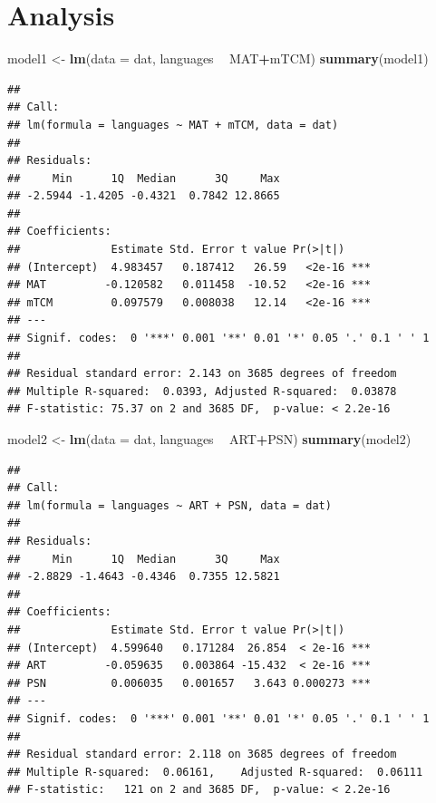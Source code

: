 \documentclass[12pt,]{article}
\newenvironment{Shaded}{\begin{snugshade}}{\end{snugshade}}
\newcommand{\KeywordTok}[1]{\textcolor[rgb]{0.13,0.29,0.53}{\textbf{#1}}}
\newcommand{\DataTypeTok}[1]{\textcolor[rgb]{0.13,0.29,0.53}{#1}}
\newcommand{\StringTok}[1]{\textcolor[rgb]{0.31,0.60,0.02}{#1}}
\newcommand{\OperatorTok}[1]{\textcolor[rgb]{0.81,0.36,0.00}{\textbf{#1}}}
\newcommand{\NormalTok}[1]{#1}
\begin{document}
\newpage

\section{Analysis}\label{analysis}

\begin{Shaded}
\begin{Highlighting}[]
\NormalTok{model1 <-}\StringTok{ }\KeywordTok{lm}\NormalTok{(}\DataTypeTok{data =}\NormalTok{ dat, languages }\OperatorTok{~}\StringTok{ }\NormalTok{MAT}\OperatorTok{+}\NormalTok{mTCM)}
\KeywordTok{summary}\NormalTok{(model1)}
\end{Highlighting}
\end{Shaded}

\begin{verbatim}
## 
## Call:
## lm(formula = languages ~ MAT + mTCM, data = dat)
## 
## Residuals:
##     Min      1Q  Median      3Q     Max 
## -2.5944 -1.4205 -0.4321  0.7842 12.8665 
## 
## Coefficients:
##              Estimate Std. Error t value Pr(>|t|)    
## (Intercept)  4.983457   0.187412   26.59   <2e-16 ***
## MAT         -0.120582   0.011458  -10.52   <2e-16 ***
## mTCM         0.097579   0.008038   12.14   <2e-16 ***
## ---
## Signif. codes:  0 '***' 0.001 '**' 0.01 '*' 0.05 '.' 0.1 ' ' 1
## 
## Residual standard error: 2.143 on 3685 degrees of freedom
## Multiple R-squared:  0.0393, Adjusted R-squared:  0.03878 
## F-statistic: 75.37 on 2 and 3685 DF,  p-value: < 2.2e-16
\end{verbatim}

\begin{Shaded}
\begin{Highlighting}[]
\NormalTok{model2 <-}\StringTok{ }\KeywordTok{lm}\NormalTok{(}\DataTypeTok{data =}\NormalTok{ dat, languages }\OperatorTok{~}\StringTok{ }\NormalTok{ART}\OperatorTok{+}\NormalTok{PSN)}
\KeywordTok{summary}\NormalTok{(model2)}
\end{Highlighting}
\end{Shaded}

\begin{verbatim}
## 
## Call:
## lm(formula = languages ~ ART + PSN, data = dat)
## 
## Residuals:
##     Min      1Q  Median      3Q     Max 
## -2.8829 -1.4643 -0.4346  0.7355 12.5821 
## 
## Coefficients:
##              Estimate Std. Error t value Pr(>|t|)    
## (Intercept)  4.599640   0.171284  26.854  < 2e-16 ***
## ART         -0.059635   0.003864 -15.432  < 2e-16 ***
## PSN          0.006035   0.001657   3.643 0.000273 ***
## ---
## Signif. codes:  0 '***' 0.001 '**' 0.01 '*' 0.05 '.' 0.1 ' ' 1
## 
## Residual standard error: 2.118 on 3685 degrees of freedom
## Multiple R-squared:  0.06161,    Adjusted R-squared:  0.06111 
## F-statistic:   121 on 2 and 3685 DF,  p-value: < 2.2e-16
\end{verbatim}
\end{document}
